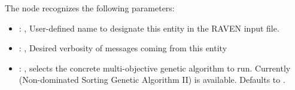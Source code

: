   The  node recognizes the following parameters:
    \begin{itemize}
      \item {}: ,
        User-defined name to designate this entity in the RAVEN input file.
      \item {}: ,
        Desired verbosity of messages coming from this entity
      \item {}: ,
        selects the concrete multi-objective genetic algorithm to run. Currently 
        (Non-dominated Sorting Genetic Algorithm II) is available. Defaults to . 
  \end{itemize}


